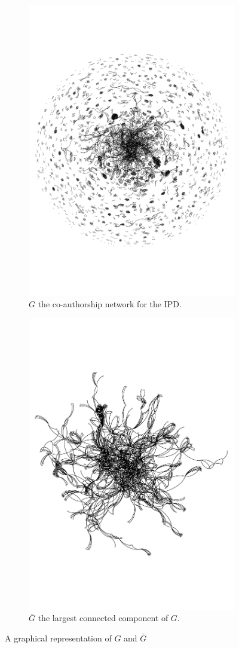 \documentclass{article}
\theoremstyle{definition}
\begin{document}
\begin{figure}[!hbtp]\vspace{-2cm}
    \begin{subfigure}{.95\textwidth}\centering
        \includegraphics[width=.5\textwidth]{./assets/images/pd_network.pdf}
        \caption{\(G\) the co-authorship network for the IPD.}
    \end{subfigure}\hfill
    \begin{subfigure}{.95\textwidth}\centering
        \includegraphics[width=.5\textwidth]{./assets/images/pd_network_cluster.pdf}
        \caption{\(\bar{G}\) the largest connected component of \(G\).}
     \end{subfigure}
     \caption{A graphical representation of \(G\) and \(\bar{G}\)}\label{fig:graphical_representation_graphs}
\end{figure}
\end{document}
